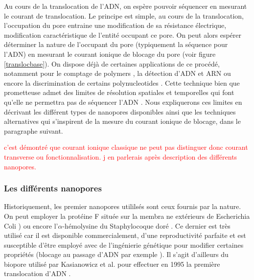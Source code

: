 Au cours de la translocation de l'ADN, on espère pouvoir séquencer en mesurant le courant de translocation. Le principe est simple, au cours de la translocation, l'occupation du pore entraine une modification de sa résistance électrique, modification caractéristique de l'entité occupant ce pore. On peut alors espérer déterminer la nature de l'occupant du pore (typiquement la séquence pour l'ADN) en mesurant le courant ionique de blocage du pore (voir figure \ref{translocbase}). On dispose déjà de certaines applications de ce procédé, notamment pour le comptage de polymers \cite{Bezrukov1994}, la détection d'ADN et ARN \cite{Kasianowicz1996} ou encore la discrimination de certains polynucleotides \cite{Akeson1999,Meller2000,Ashkenasy2005}. Cette technique bien que prometteuse admet des limites de résolution spatiales et temporelles qui font qu'elle ne permettra pas de séquencer l'ADN \cite{Branton2008}. Nous expliquerons ces limites en décrivant les différent types de nanopores disponibles ainsi que les techniques alternatives qui s'inspirent de la mesure du courant ionique de blocage, dans le paragraphe suivant.

\textcolor{red}{c'est démontré que courant ionique classique ne peut pas distinguer donc courant transverse ou fonctionnalisation. j en parlerais après description des différents nanopores.}

\subsubsection{Les différents nanopores}


Historiquement, les premier nanopores utililsés sont ceux fournis par la nature. On peut employer la protéine F située sur la membra ne extérieurs de Escherichia Coli \cite{Danelon2006,Chimerel2008})
ou encore l'$\alpha$-hémolysine du Staphylocoque doré \cite{Bhakdi01121991}. Ce dernier est très utilisé car il est disponible commercialement, d'une reproductivité parfaite et est susceptible d'être employé avec de l'ingénierie génétique pour modifier certaines propriétés (blocage au passage d'ADN par exemple \cite{Howorka2001}). Il s'agit d'ailleurs du biopore utilisé par Kasianowicz et al. pour effectuer en 1995 la première translocation d'ADN \cite{Kasianowicz1996}.



